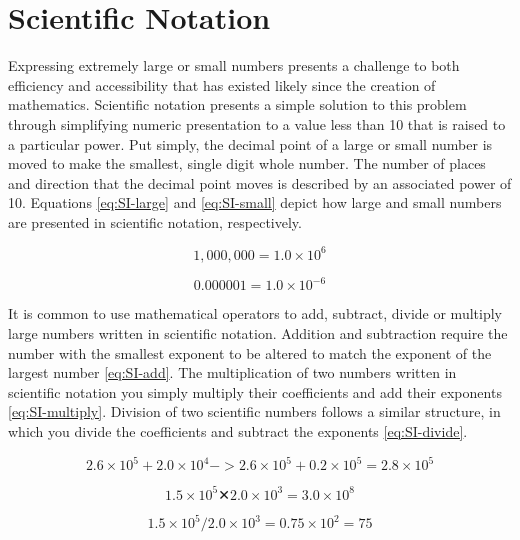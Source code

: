 \documentclass[
]{book}
\begin{document}
\hypertarget{scientific-notation}{%
\section{Scientific Notation}\label{scientific-notation}}

Expressing extremely large or small numbers presents a challenge to both
efficiency and accessibility that has existed likely since the creation
of mathematics. Scientific notation presents a simple solution to this
problem through simplifying numeric presentation to a value less than 10
that is raised to a particular power. Put simply, the decimal point of a
large or small number is moved to make the smallest, single digit whole
number. The number of places and direction that the decimal point moves
is described by an associated power of 10. Equations \eqref{eq:SI-large}
and \eqref{eq:SI-small} depict how large and small numbers are presented
in scientific notation, respectively.

\begin{equation}
1,000,000 = 1.0 × 10^{6} 
\label{eq:SI-large}
\end{equation}

\begin{equation}
0.000001 = 1.0 × 10 ^{-6} 
\label{eq:SI-small}
\end{equation}

It is common to use mathematical operators to add, subtract, divide or
multiply large numbers written in scientific notation. Addition and
subtraction require the number with the smallest exponent to be altered
to match the exponent of the largest number \eqref{eq:SI-add}. The
multiplication of two numbers written in scientific notation you simply
multiply their coefficients and add their exponents
\eqref{eq:SI-multiply}. Division of two scientific numbers follows a
similar structure, in which you divide the coefficients and subtract the
exponents \eqref{eq:SI-divide}.

\begin{equation}
2.6 × 10 ^{5} + 2.0 × 10 ^{4}   ->
2.6 × 10 ^{5} + 0.2 × 10 ^{5} = 2.8 × 10 ^{5} 
\label{eq:SI-add}
\end{equation}

\begin{equation}
1.5 × 10 ^{5} ✕ 2.0 × 10 ^{3} = 3.0 × 10 ^{8} 
\label{eq:SI-multiply}
\end{equation}

\begin{equation}
1.5 × 10 ^{5} / 2.0 × 10 ^{3} = 0.75 × 10 ^{2} = 75
\label{eq:SI-divide}
\end{equation}
\end{document}
